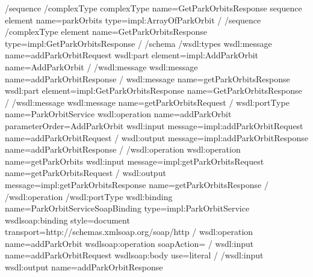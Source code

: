 \documentclass[letterpaper,10pt,english]{sphinxmanual}
\begin{document}
\begin{sphinxVerbatim}[commandchars=\\\{\}]
\PYGZlt{}/sequence\PYGZgt{}
\PYGZlt{}/complexType\PYGZgt{}
\PYGZlt{}complexType name=\PYGZdq{}GetParkOrbitsResponse\PYGZdq{}\PYGZgt{}
\PYGZlt{}sequence\PYGZgt{}
\PYGZlt{}element name=\PYGZdq{}parkOrbits\PYGZdq{} type=\PYGZdq{}impl:ArrayOfParkOrbit\PYGZdq{} /\PYGZgt{}
\PYGZlt{}/sequence\PYGZgt{}
\PYGZlt{}/complexType\PYGZgt{}
\PYGZlt{}element name=\PYGZdq{}GetParkOrbitsResponse\PYGZdq{} type=\PYGZdq{}impl:GetParkOrbitsResponse\PYGZdq{} /\PYGZgt{}
\PYGZlt{}/schema\PYGZgt{}
\PYGZlt{}/wsdl:types\PYGZgt{}
\PYGZlt{}wsdl:message name=\PYGZdq{}addParkOrbitRequest\PYGZdq{}\PYGZgt{}
\PYGZlt{}wsdl:part element=\PYGZdq{}impl:AddParkOrbit\PYGZdq{} name=\PYGZdq{}AddParkOrbit\PYGZdq{} /\PYGZgt{}
\PYGZlt{}/wsdl:message\PYGZgt{}
\PYGZlt{}wsdl:message name=\PYGZdq{}addParkOrbitResponse\PYGZdq{} /\PYGZgt{}
\PYGZlt{}wsdl:message name=\PYGZdq{}getParkOrbitsResponse\PYGZdq{}\PYGZgt{}
\PYGZlt{}wsdl:part element=\PYGZdq{}impl:GetParkOrbitsResponse\PYGZdq{} name=\PYGZdq{}GetParkOrbitsResponse\PYGZdq{} /\PYGZgt{}
\PYGZlt{}/wsdl:message\PYGZgt{}
\PYGZlt{}wsdl:message name=\PYGZdq{}getParkOrbitsRequest\PYGZdq{} /\PYGZgt{}
\PYGZlt{}wsdl:portType name=\PYGZdq{}ParkOrbitService\PYGZdq{}\PYGZgt{}
\PYGZlt{}wsdl:operation name=\PYGZdq{}addParkOrbit\PYGZdq{} parameterOrder=\PYGZdq{}AddParkOrbit\PYGZdq{}\PYGZgt{}
\PYGZlt{}wsdl:input message=\PYGZdq{}impl:addParkOrbitRequest\PYGZdq{} name=\PYGZdq{}addParkOrbitRequest\PYGZdq{} /\PYGZgt{}
\PYGZlt{}wsdl:output message=\PYGZdq{}impl:addParkOrbitResponse\PYGZdq{} name=\PYGZdq{}addParkOrbitResponse\PYGZdq{} /\PYGZgt{}
\PYGZlt{}/wsdl:operation\PYGZgt{}
\PYGZlt{}wsdl:operation name=\PYGZdq{}getParkOrbits\PYGZdq{}\PYGZgt{}
\PYGZlt{}wsdl:input message=\PYGZdq{}impl:getParkOrbitsRequest\PYGZdq{} name=\PYGZdq{}getParkOrbitsRequest\PYGZdq{} /\PYGZgt{}
\PYGZlt{}wsdl:output message=\PYGZdq{}impl:getParkOrbitsResponse\PYGZdq{} name=\PYGZdq{}getParkOrbitsResponse\PYGZdq{} /\PYGZgt{}
\PYGZlt{}/wsdl:operation\PYGZgt{}
\PYGZlt{}/wsdl:portType\PYGZgt{}
\PYGZlt{}wsdl:binding name=\PYGZdq{}ParkOrbitServiceSoapBinding\PYGZdq{} type=\PYGZdq{}impl:ParkOrbitService\PYGZdq{}\PYGZgt{}
\PYGZlt{}wsdlsoap:binding style=\PYGZdq{}document\PYGZdq{} transport=\PYGZdq{}http://schemas.xmlsoap.org/soap/http\PYGZdq{} /\PYGZgt{}
\PYGZlt{}wsdl:operation name=\PYGZdq{}addParkOrbit\PYGZdq{}\PYGZgt{}
\PYGZlt{}wsdlsoap:operation soapAction=\PYGZdq{}\PYGZdq{} /\PYGZgt{}
\PYGZlt{}wsdl:input name=\PYGZdq{}addParkOrbitRequest\PYGZdq{}\PYGZgt{}
\PYGZlt{}wsdlsoap:body use=\PYGZdq{}literal\PYGZdq{} /\PYGZgt{}
\PYGZlt{}/wsdl:input\PYGZgt{}
\PYGZlt{}wsdl:output name=\PYGZdq{}addParkOrbitResponse\PYGZdq{}\PYGZgt{}

\end{sphinxVerbatim}
\end{document}
